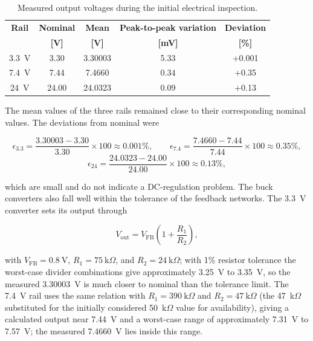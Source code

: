 \begin{table}[h]
    \centering
    \small
    \caption{Measured output voltages during the initial electrical inspection.}
    \label{tab:measured_dc_outputs}
    \begin{tabular}{|c|c|c|c|c|}
        \hline
        \textbf{Rail} &
        \textbf{Nominal} &
        \textbf{Mean} &
        \textbf{Peak-to-peak variation} &
        \textbf{Deviation} \\
        &
        \textbf{[V]} &
        \textbf{[V]} &
        \textbf{[mV]} &
        \textbf{[\%]} \\
        \hline
        3.3~V &
        3.30 &
        3.30003 &
        5.33 &
        +0.001 \\
        \hline
        7.4~V &
        7.44 &
        7.4660 &
        $0.34$ &
        +0.35 \\
        \hline
        24~V &
        24.00 &
        24.0323 &
        $0.09$ &
        +0.13 \\
        \hline
    \end{tabular}
\end{table}

The mean values of the three rails remained close to their corresponding nominal values. The deviations from nominal were

\begin{equation}
\epsilon_{3.3} = \frac{3.30003 - 3.30}{3.30}\times 100 \approx 0.001\%, \qquad
\epsilon_{7.4} = \frac{7.4660 - 7.44}{7.44}\times 100 \approx 0.35\%,
\end{equation}
\begin{equation}
\epsilon_{24} = \frac{24.0323 - 24.00}{24.00}\times 100 \approx 0.13\%,
\end{equation}

which are small and do not indicate a DC-regulation problem. The buck converters also fall well within the tolerance of the feedback networks. The 3.3~V converter sets its output through

\begin{equation}
V_{\mathrm{out}} = V_{\mathrm{FB}}\left(1 + \frac{R_1}{R_2}\right),
\end{equation}

with \(V_{\mathrm{FB}} = 0.8~\mathrm{V}\), \(R_1 = 75~\mathrm{k}\Omega\), and \(R_2 = 24~\mathrm{k}\Omega\); with 1\% resistor tolerance the worst-case divider combinations give approximately 3.25~V to 3.35~V, so the measured 3.30003~V is much closer to nominal than the tolerance limit. The 7.4~V rail uses the same relation with \(R_1 = 390~\mathrm{k}\Omega\) and \(R_2 = 47~\mathrm{k}\Omega\) (the 47~k\(\Omega\) substituted for the initially considered 50~k\(\Omega\) value for availability), giving a calculated output near 7.44~V and a worst-case range of approximately 7.31~V to 7.57~V; the measured 7.4660~V lies inside this range.

